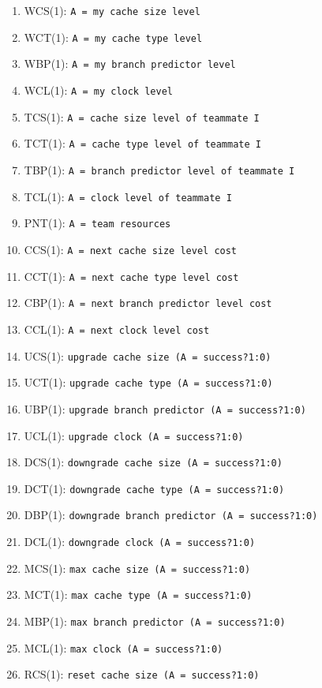 \documentclass{article}
\begin{document}
\begin{enumerate}[noitemsep]
    \item WCS(1): \texttt{A = my cache size level}
    \item WCT(1): \texttt{A = my cache type level}
    \item WBP(1): \texttt{A = my branch predictor level}
    \item WCL(1): \texttt{A = my clock level}
    \item TCS(1): \texttt{A = cache size level of teammate I}
    \item TCT(1): \texttt{A = cache type level of teammate I}
    \item TBP(1): \texttt{A = branch predictor level of teammate I}
    \item TCL(1): \texttt{A = clock level of teammate I}
    \item PNT(1): \texttt{A = team resources}
    \item CCS(1): \texttt{A = next cache size level cost}
    \item CCT(1): \texttt{A = next cache type level cost}
    \item CBP(1): \texttt{A = next branch predictor level cost}
    \item CCL(1): \texttt{A = next clock level cost}
    \item UCS(1): \texttt{upgrade cache size (A = success?1:0)}
    \item UCT(1): \texttt{upgrade cache type (A = success?1:0)}
    \item UBP(1): \texttt{upgrade branch predictor (A = success?1:0)}
    \item UCL(1): \texttt{upgrade clock (A = success?1:0)}
    \item DCS(1): \texttt{downgrade cache size (A = success?1:0)}
    \item DCT(1): \texttt{downgrade cache type (A = success?1:0)}
    \item DBP(1): \texttt{downgrade branch predictor (A = success?1:0)}
    \item DCL(1): \texttt{downgrade clock (A = success?1:0)}
    \item MCS(1): \texttt{max cache size (A = success?1:0)}
    \item MCT(1): \texttt{max cache type (A = success?1:0)}
    \item MBP(1): \texttt{max branch predictor (A = success?1:0)}
    \item MCL(1): \texttt{max clock (A = success?1:0)}
    \item RCS(1): \texttt{reset cache size (A = success?1:0)}

\end{enumerate}
\end{document}
